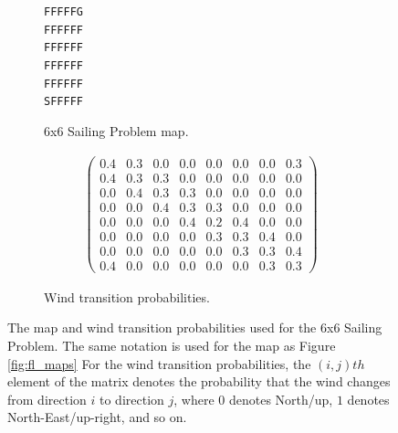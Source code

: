             \begin{figure}
                \centering
                \begin{subfigure}[b]{0.49\textwidth}
                    \centering
                    \texttt{FFFFFG} \\
                    \texttt{FFFFFF} \\
                    \texttt{FFFFFF} \\
                    \texttt{FFFFFF} \\
                    \texttt{FFFFFF} \\
                    \texttt{SFFFFF} 
                    \caption{6x6 Sailing Problem map.}
                \end{subfigure}
                \begin{subfigure}[b]{0.49\textwidth}
                    \centering
                    \begin{align*}
                        \begin{pmatrix}
                        0.4 & 0.3 & 0.0 & 0.0 & 0.0 & 0.0 & 0.0 & 0.3 \\
                        0.4 & 0.3 & 0.3 & 0.0 & 0.0 & 0.0 & 0.0 & 0.0 \\
                        0.0 & 0.4 & 0.3 & 0.3 & 0.0 & 0.0 & 0.0 & 0.0 \\
                        0.0 & 0.0 & 0.4 & 0.3 & 0.3 & 0.0 & 0.0 & 0.0 \\
                        0.0 & 0.0 & 0.0 & 0.4 & 0.2 & 0.4 & 0.0 & 0.0 \\
                        0.0 & 0.0 & 0.0 & 0.0 & 0.3 & 0.3 & 0.4 & 0.0 \\
                        0.0 & 0.0 & 0.0 & 0.0 & 0.0 & 0.3 & 0.3 & 0.4 \\
                        0.4 & 0.0 & 0.0 & 0.0 & 0.0 & 0.0 & 0.3 & 0.3 
                        \end{pmatrix}
                    \end{align*}
                    \caption{Wind transition probabilities.}
                \end{subfigure}
                \caption[The map and wind transition probabilities used for the 6x6 Sailing Problem.]{The map and wind transition probabilities used for the 6x6 Sailing Problem. The same notation is used for the map as Figure \ref{fig:fl_maps} For the wind transition probabilities, the $(i,j)th$ element of the matrix denotes the probability that the wind changes from direction $i$ to direction $j$, where $0$ denotes North/up, $1$ denotes North-East/up-right, and so on.}
                \label{fig:sailing_deets}
            \end{figure}




